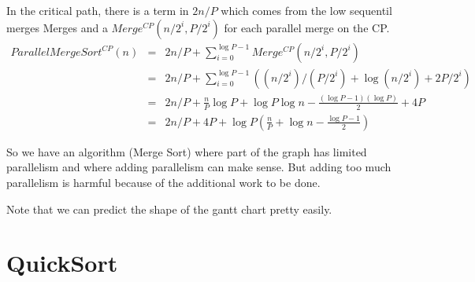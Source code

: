 \documentclass{article}
\begin{document}
In the critical path, there is a term in $2 n/P$ which comes from the
low sequentil merges Merges and a $Merge^{CP}(n/2^i,P/2^i)$ for each
parallel merge on the CP.
\begin{align}
  ParallelMergeSort^{CP}(n) & = & 2n/P + \sum_{i=0}^{\log P-1} Merge^{CP}(n/2^i,P/2^i) \\
  & = & 2n/P + \sum_{i=0}^{\log P-1} \left ( (n/2^i)/(P/2^i) + \log (n/2^i) + 2P/2^i \right )\\
  & = & 2n/P + \frac{n}{P} \log P  + \log P \log n - \frac{(\log P - 1)(\log P)}{2}  + 4P \\
  & = & 2n/P + 4P + \log P \left ( \frac{n}{P}   +  \log n - \frac{\log P - 1}{2}  \right )
\end{align}

So we have an algorithm (Merge Sort) where part of the graph has
limited parallelism and where adding parallelism can make sense. But
adding too much parallelism is harmful because of the additional work
to be done.

Note that we can predict the shape of the gantt chart pretty easily.

\section{QuickSort}
\end{document}
